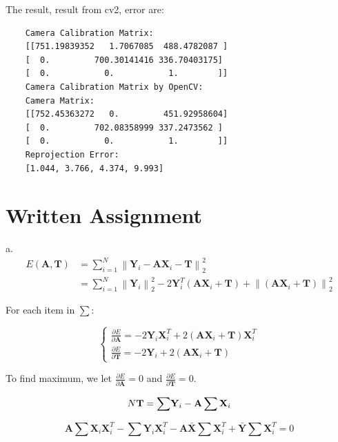 \documentclass{article}
\theoremstyle{definition}
\begin{document}
	The result, result from cv2, error are:
	
	\begin{verbatim}
	Camera Calibration Matrix:
	[[751.19839352   1.7067085  488.4782087 ]
	[  0.         700.30141416 336.70403175]
	[  0.           0.           1.        ]]
	Camera Calibration Matrix by OpenCV:
	Camera Matrix:
	[[752.45363272   0.         451.92958604]
	[  0.         702.08358999 337.2473562 ]
	[  0.           0.           1.        ]]
	Reprojection Error:
	[1.044, 3.766, 4.374, 9.993]
	\end{verbatim}
	
	\section*{Written Assignment}
	a.
	\begin{equation}
		\begin{aligned}
			E(\mathbf{A}, \mathbf{T})&=\sum_{i=1}^N\left\|\mathbf{Y}_i-\mathbf{A} \mathbf{X}_i-\mathbf{T} \right\|_2^2\\
			&=\sum_{i=1}^N\left\|\mathbf{Y}_i\right\|_2^2 - 2 \mathbf{Y}_i^T(\mathbf{A} \mathbf{X}_i+\mathbf{T}) + \left\|(\mathbf{A} \mathbf{X}_i+\mathbf{T})\right\|_2^2
		\end{aligned}
	\end{equation}
	
	For each item in $\sum$:
	
	\begin{equation}
		\begin{cases}
			\frac{\partial E}{\partial \mathbf A}=-2\mathbf Y_i\mathbf X_i^T+2(\mathbf{A} \mathbf{X}_i+\mathbf{T})\mathbf X_i^T\\
			\frac{\partial E}{\partial \mathbf T}=-2\mathbf Y_i+2(\mathbf{A} \mathbf{X}_i+\mathbf{T})
		\end{cases}
	\end{equation}
	
	To find maximum, we let $\frac{\partial E}{\partial \mathbf A}=0$ and $\frac{\partial E}{\partial \mathbf T}=0$.
	
	\begin{equation}
		N\mathbf T = \mathbf \sum \mathbf Y_i - \mathbf A \sum \mathbf X_i \\
	\end{equation}

	\begin{equation}
		\mathbf A \sum \mathbf X_i\mathbf X_i^T - \mathbf \sum \mathbf Y_i\mathbf X_i^T - \mathbf A  \mathbf {\bar X}\sum\mathbf X_i^T +  \mathbf {\bar Y}\sum\mathbf X_i^T=0
		\label{1}
	\end{equation}
	
\end{document}
